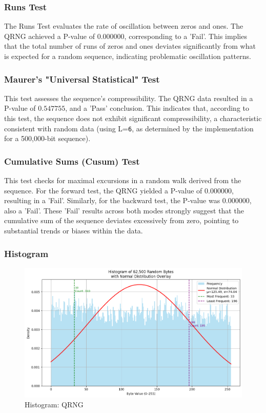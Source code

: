 \subsubsection{\textbf{Runs Test}}
The Runs Test evaluates the rate of oscillation between zeros and ones. The QRNG achieved a P-value of $0.000000$, corresponding to a 'Fail'. This implies that the total number of runs of zeros and ones deviates significantly from what is expected for a random sequence, indicating problematic oscillation patterns.

\subsubsection{\textbf{Maurer's "Universal Statistical" Test}}
This test assesses the sequence's compressibility. The QRNG data resulted in a P-value of $0.547755$, and a 'Pass' conclusion. This indicates that, according to this test, the sequence does not exhibit significant compressibility, a characteristic consistent with random data (using L=\texttt{6}, as determined by the implementation for a 500,000-bit sequence).

\subsubsection{\textbf{Cumulative Sums (Cusum) Test}}
This test checks for maximal excursions in a random walk derived from the sequence. For the forward test, the QRNG yielded a P-value of $0.000000$, resulting in a 'Fail'. Similarly, for the backward test, the P-value was $0.000000$, also a 'Fail'. These 'Fail' results across both modes strongly suggest that the cumulative sum of the sequence deviates excessively from zero, pointing to substantial trends or biases within the data.

\subsubsection{\textbf{Histogram}}


\begin{figure}[htbp] 
    \centering 
    \includegraphics[width=0.9\columnwidth]{images/Hist_QRNG.png} 
    \caption{Histogram: QRNG}
    \label{fig:H:QRNG}
\end{figure}

